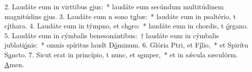 2. Laudáte eum in virttibus \uline{e}jus:~* laudáte eum secúndum multitúdinem magnitúdins \uline{e}jus.
3. Laudáte eum n sono t\uline{u}bæ:~* laudáte eum in psaltério, t c\uline{í}thara.
4. Laudáte eum in týmpno, et ch\uline{o}ro:~* laudáte eum in chordis, t \uline{ó}rgano.
5. Laudáte eum in cýmbalis benesonántibus:~† laudáte eum in cýmbalis jublati\uline{ó}nis:~* omnis spíritus laudt D\uline{ó}minum.
6. Glória Ptri, et F\uline{í}lio,~* et Spirítu S\uline{a}ncto.
7. Sicut erat in princípio, t nunc, et s\uline{e}mper,~* et in sǽcula sæculórm. \uline{A}men.
